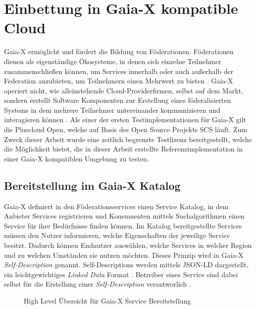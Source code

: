 \chapter{Einbettung in Gaia-X kompatible Cloud}
\label{chapter:gaia-x-einbettung}
Gaia-X ermöglicht und fördert die Bildung von Föderationen.
Föderationen dienen als eigenständige Ökosysteme, in denen sich einzelne Teilnehmer zusammenschließen können,
um Services innerhalb oder auch außerhalb der Federation anzubieten, um Teilnehmern einen Mehrwert zu bieten \cite{GXFS2021}.
Gaia-X operiert nicht, wie alleinstehende Cloud-Providerfirmen, selbst auf dem Markt, sondern erstellt
Software Komponenten zur Erstellung eines föderalisierten Systems in dem mehrere Teilnehmer
untereinander kommunizieren und interagieren können \cite{GXFS2021}.
Als einer der ersten Testimplementationen für Gaia-X gilt die Pluscloud Open,
welche auf Basis des Open Source Projekts \ac{SCS} läuft.
Zum Zweck dieser Arbeit wurde eine zeitlich begrenzte Testlizenz bereitgestellt,
welche die Möglichkeit bietet, die in dieser Arbeit erstellte Referenzimplementation
in einer Gaia-X kompatiblen Umgebung zu testen.


\section{Bereitstellung im Gaia-X Katalog}
\label{sec:gaia-x-einbettung:gaia-x-katalog}
Gaia-X definiert in den Föderationsservices einen Service Katalog, in dem Anbieter Services registrieren
und Konsumenten mittels Suchalgorithmen einen Service für ihre Bedürfnisse finden können.
Im Katalog bereitgestellte Services müssen den Nutzer informieren, welche Eigenschaften der jeweilige Service besitzt.
Dadurch können Endnutzer auswählen, welche Services in welcher Region und zu welchen Umständen sie nutzen möchten.
Dieses Prinzip wird in Gaia-X \emph{Self-Description} genannt.
Self-Descriptions werden mittels JSON-LD dargestellt, ein
leichtgewichtiges \emph{Linked Data} Format \cite{Eggers2020}.
Betreiber eines Service sind dabei selbst für die Erstellung einer \emph{Self-Description} verantworlich \cite{GaiaXArchitecture2021}.

\begin{figure}
  \centering
  \caption{High Level Übersicht für Gaia-X Service Bereitstellung}
  \label{fig:gaia-x-orchestration-overview}
\end{figure}

